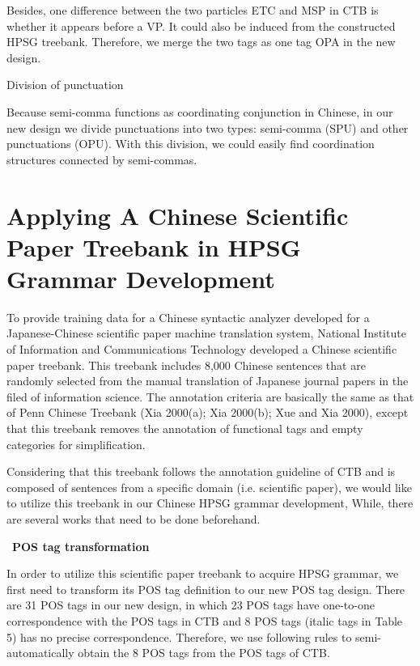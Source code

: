 \documentclass[english]{jnlp_1.4}
\renewcommand{\subsubsection}{}
\begin{document}
Besides, one difference between the two particles ETC and MSP in CTB is 
whether it appears before a VP. It could also be induced from the 
constructed HPSG treebank. Therefore, we merge the two tags as one tag OPA 
in the new design.

\subsubsection{Division of punctuation }

Because semi-comma functions as coordinating conjunction in Chinese, in our 
new design we divide punctuations into two types: semi-comma (SPU) and other 
punctuations (OPU). With this division, we could easily find coordination 
structures connected by semi-commas.



\section{Applying A Chinese Scientific Paper Treebank in HPSG Grammar Development}

To provide training data for a Chinese syntactic analyzer developed for a 
Japanese-Chinese scientific paper machine translation system, National 
Institute of Information and Communications Technology developed a Chinese 
scientific paper treebank. This treebank includes 8,000 Chinese sentences 
that are randomly selected from the manual translation of Japanese journal 
papers in the filed of information science. The annotation criteria are 
basically the same as that of Penn Chinese Treebank (Xia 2000(a); Xia 
2000(b); Xue and Xia 2000), except that this treebank removes the annotation 
of functional tags and empty categories for simplification. 

Considering that this treebank follows the annotation guideline of CTB and 
is composed of sentences from a specific domain (i.e. scientific paper), we 
would like to utilize this treebank in our Chinese HPSG grammar development, 
While, there are several works that need to be done beforehand.

\noindent
\textbullet\ \textbf{POS tag transformation}

In order to utilize this scientific paper treebank to acquire HPSG grammar, 
we first need to transform its POS tag definition to our new POS tag design. 
There are 31 POS tags in our new design, in which 23 POS tags have 
one-to-one correspondence with the POS tags in CTB and 8 POS tags (italic 
tags in Table 5) has no precise correspondence. Therefore, we use following 
rules to semi-automatically obtain the 8 POS tags from the POS tags of CTB.
\end{document}
